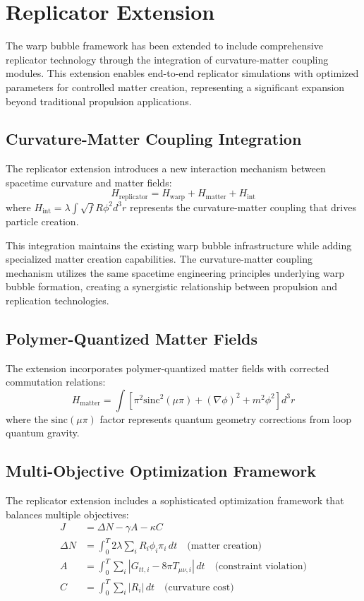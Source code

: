 
\section{Replicator Extension}

The warp bubble framework has been extended to include comprehensive replicator technology through the integration of curvature-matter coupling modules. This extension enables end-to-end replicator simulations with optimized parameters for controlled matter creation, representing a significant expansion beyond traditional propulsion applications.

\subsection{Curvature-Matter Coupling Integration}

The replicator extension introduces a new interaction mechanism between spacetime curvature and matter fields:
\[
H_{\text{replicator}} = H_{\text{warp}} + H_{\text{matter}} + H_{\text{int}}
\]
where $H_{\text{int}} = \lambda \int \sqrt{f} R \phi^2 d^3r$ represents the curvature-matter coupling that drives particle creation.

This integration maintains the existing warp bubble infrastructure while adding specialized matter creation capabilities. The curvature-matter coupling mechanism utilizes the same spacetime engineering principles underlying warp bubble formation, creating a synergistic relationship between propulsion and replication technologies.

\subsection{Polymer-Quantized Matter Fields}

The extension incorporates polymer-quantized matter fields with corrected commutation relations:
\[
H_{\text{matter}} = \int \left[ \pi^2 \text{sinc}^2(\mu \pi) + (\nabla \phi)^2 + m^2 \phi^2 \right] d^3r
\]
where the $\text{sinc}(\mu \pi)$ factor represents quantum geometry corrections from loop quantum gravity.

\subsection{Multi-Objective Optimization Framework}

The replicator extension includes a sophisticated optimization framework that balances multiple objectives:
\begin{align}
J &= \Delta N - \gamma A - \kappa C \\
\Delta N &= \int_0^T 2\lambda \sum_i R_i \phi_i \pi_i \, dt \quad \text{(matter creation)} \\
A &= \int_0^T \sum_i |G_{tt,i} - 8\pi T_{\mu\nu,i}| \, dt \quad \text{(constraint violation)} \\
C &= \int_0^T \sum_i |R_i| \, dt \quad \text{(curvature cost)}
\end{align}

